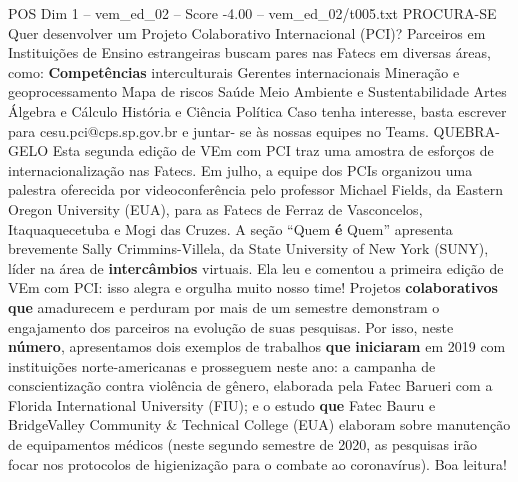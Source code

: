 \begin{textsample}{POS Dim 1 – vem\_ed\_02 – Score -4.00 – vem\_ed\_02/t005.txt}  \label{ex:f1_pos_164}
PROCURA-SE Quer desenvolver um Projeto Colaborativo Internacional (PCI)?
Parceiros em Instituições de Ensino estrangeiras buscam pares nas Fatecs em diversas áreas, como: \textbf{Competências} interculturais Gerentes internacionais Mineração e geoprocessamento Mapa de riscos Saúde Meio Ambiente e Sustentabilidade Artes Álgebra e Cálculo História e Ciência Política Caso tenha interesse, basta escrever para cesu.pci@cps.sp.gov.br e juntar- se às nossas equipes no Teams.
QUEBRA-GELO Esta segunda edição de VEm com PCI traz uma amostra de esforços de internacionalização nas Fatecs.
Em julho, a equipe dos PCIs organizou uma palestra oferecida por videoconferência pelo professor Michael Fields, da Eastern Oregon University (EUA), para as Fatecs de Ferraz de Vasconcelos, Itaquaquecetuba e Mogi das Cruzes.
A seção “Quem \textbf{é} Quem” apresenta brevemente Sally Crimmins-Villela, da State University of New York (SUNY), líder na área de \textbf{intercâmbios} virtuais.
Ela leu e comentou a primeira edição de VEm com PCI: isso alegra e orgulha muito nosso time!
Projetos \textbf{colaborativos} \textbf{que} amadurecem e perduram por mais de um semestre demonstram o engajamento dos parceiros na evolução de suas pesquisas.
Por isso, neste \textbf{número}, apresentamos dois exemplos de trabalhos \textbf{que} \textbf{iniciaram} em 2019 com instituições norte-americanas e prosseguem neste ano: a campanha de conscientização contra violência de gênero, elaborada pela Fatec Barueri com a Florida International University (FIU); e o estudo \textbf{que} Fatec Bauru e BridgeValley Community \& Technical College (EUA) elaboram sobre manutenção de equipamentos médicos (neste segundo semestre de 2020, as pesquisas irão focar nos protocolos de higienização para o combate ao coronavírus).
Boa leitura!

\end{textsample}
